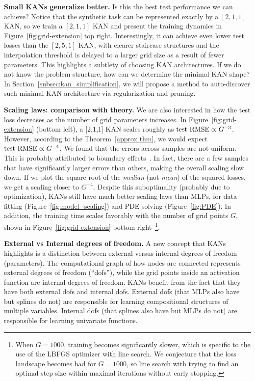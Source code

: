 \documentclass{article}
\numberwithin{equation}{section}
\numberwithin{figure}{section}
\begin{document}
{\bf Small KANs generalize better.} Is this the best test performance we can achieve? Notice that the synthetic task can be represented exactly by a $[2,1,1]$ KAN, so we train a $[2,1,1]$ KAN and present the training dynamics in Figure~\ref{fig:grid-extension} top right. Interestingly, it can achieve even lower test losses than the $[2,5,1]$ KAN, with clearer staircase structures and the interpolation threshold is delayed to a larger grid size as a result of fewer parameters. This highlights a subtlety of choosing KAN architectures. If we do not know the problem structure, how can we determine the minimal KAN shape? In Section~\ref{subsec:kan_simplification}, we will propose a method to auto-discover such minimal KAN architecture via regularization and pruning.

{\bf Scaling laws: comparison with theory.} We are also interested in how the test loss decreases as the number of grid parameters increases. In Figure~\ref{fig:grid-extension} (bottom left), a [2,1,1] KAN scales roughly as ${\rm test \ RMSE}\propto G^{-3}$. However, according to the Theorem~\ref{approx thm}, we would expect ${\rm test \ RMSE}\propto G^{-4}$. We found that the errors across samples are not uniform. This is probably attributed to boundary effects~\cite{michaud2023precision}. In fact, there are a few samples that have significantly larger errors than others, making the overall scaling slow down. If we plot the square root of the \textit{median} (not \textit{mean}) of the squared losses, we get a scaling closer to $G^{-4}$. Despite this suboptimality (probably due to optimization), KANs still have much better scaling laws than MLPs, for data fitting (Figure~\ref{fig:model_scaling}) and PDE solving (Figure~\ref{fig:PDE}). In addition, the training time scales favorably with the number of grid points $G$, shown in Figure~\ref{fig:grid-extension} bottom right~\footnote{When $G=1000$, training becomes significantly slower, which is specific to the use of the LBFGS optimizer with line search. We conjecture that the loss landscape becomes bad for $G=1000$, so line search with trying to find an optimal step size within maximal iterations without early stopping.}.


{\bf External vs Internal degrees of freedom.} A new concept that KANs highlights is a distinction between external versus internal degrees of freedom (parameters). The computational graph of how nodes are connected represents external degrees of freedom (``dofs''), while the grid points inside an activation function are internal degrees of freedom. KANs benefit from the fact that they have both external dofs and internal dofs. External dofs (that MLPs also have but splines do not) are responsible for learning compositional structures of multiple variables. Internal dofs (that splines also have but MLPs do not) are responsible for learning univariate functions. 
\end{document}
